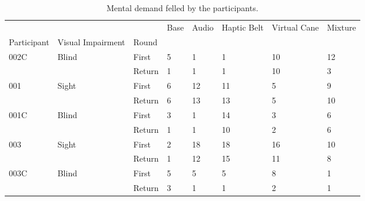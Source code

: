 
\begin{table}[!htb]
\centering
\caption{Mental demand felled by the participants.}
\label{tab:md_table}
\begin{tabular}{llllllll}
\toprule
     &       &        & Base & Audio & Haptic Belt & Virtual Cane & Mixture \\
Participant & Visual Impairment & Round &      &       &             &              &         \\
\midrule
002C & Blind & First &    5 &     1 &           1 &           10 &      12 \\
     &       & Return &    1 &     1 &           1 &           10 &       3 \\
001 & Sight & First &    6 &    12 &          11 &            5 &       9 \\
     &       & Return &    6 &    13 &          13 &            5 &      10 \\
001C & Blind & First &    3 &     1 &          14 &            3 &       6 \\
     &       & Return &    1 &     1 &          10 &            2 &       6 \\
003 & Sight & First &    2 &    18 &          18 &           16 &      10 \\
     &       & Return &    1 &    12 &          15 &           11 &       8 \\
003C & Blind & First &    5 &     5 &           5 &            8 &       1 \\
     &       & Return &    3 &     1 &           1 &            2 &       1 \\
\bottomrule
\end{tabular}
\end{table}

